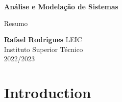 \documentclass[12pt]{article}
\begin{document}
\begin{titlepage}
    \begin{center}
        \vspace*{1cm}

        \textbf{Análise e Modelação de Sistemas}
        \vspace{0.5cm}

        Resumo
        \vspace{1.5cm}

        \textbf{Rafael Rodrigues}
        \vfill
        LEIC \\
        Instituto Superior Técnico \\
        2022/2023
    \end{center}
\end{titlepage}

\tableofcontents

\newpage

\section{Introduction}
\end{document}
